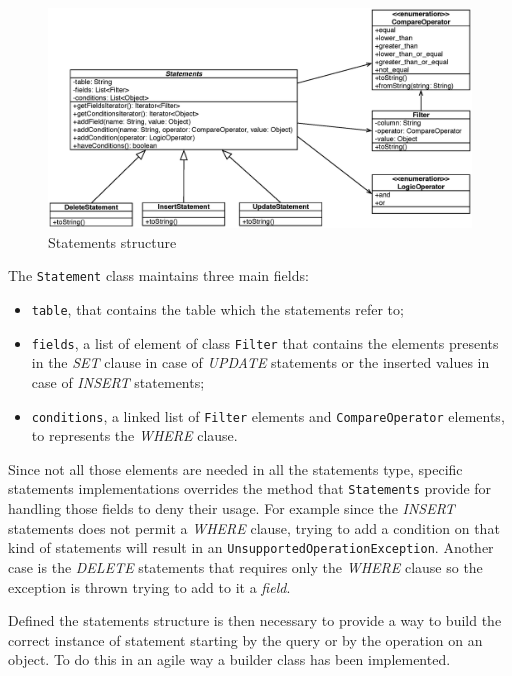\begin{figure}[tbh]
  \centering
  \includegraphics[width=13cm]{images/statements}
  \caption{Statements structure}
  \label{fig:statements}
\end{figure} 

\noindent The \texttt{Statement} class maintains three main fields:
\begin{itemize}
\item \texttt{table}, that contains the table which the statements refer to;
\item \texttt{fields}, a list of element of class \texttt{Filter} that contains the elements presents in the \textit{SET} clause in case of \textit{UPDATE} statements or the inserted values in case of \textit{INSERT} statements;
\item \texttt{conditions}, a linked list of \texttt{Filter} elements and \texttt{CompareOperator} elements, to represents the \textit{WHERE} clause.
\end{itemize} 

\noindent Since not all those elements are needed in all the statements type, specific statements implementations overrides the method that \texttt{Statements} provide for handling those fields to deny their usage. For example since the \textit{INSERT} statements does not permit a \textit{WHERE} clause, trying to add a condition on that kind of statements will result in an \texttt{UnsupportedOperationException}. Another case is the \textit{DELETE} statements that requires only the \textit{WHERE} clause so the exception is thrown trying to add to it a \textit{field}.

\newparagraph Defined the statements structure is then necessary to provide a way to build the correct instance of statement starting by the query or by the operation on an object.
To do this in an agile way a builder class has been implemented.

